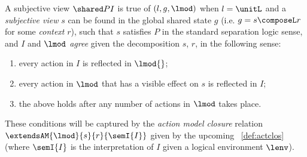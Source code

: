 A subjective view $\shared P I$ is true of $(l,g,\lmod)$ when $l = \unitL$ and a \emph{subjective view} $s$ can be found in the global shared state $g$ (i.e. $g = s\composeL r$ for some \emph{context} $r$), such that $s$ satisfies $P$ in the standard separation logic sense, and $I$ and $\lmod$ \emph{agree} given the
decomposition $s$, $r$, in the following sense:\vspace{-10pt}
%
\begin{enumerate}
	\item every action in $I$ is reflected in $\lmod{}$;
	
	\item every action in $\lmod$ that has a visible effect on $s$ is reflected in $I$;
	
	\item the above holds after any number of actions in $\lmod$ takes place.
\end{enumerate}\vspace{-10pt}
%
These conditions will be captured by the \emph{action model closure} relation $\extendsAM{\lmod}{s}{r}{\semI{I}}$ given by the upcoming ~\ref{def:actclos} (where $\semI{I}$ is the interpretation of $I$ given a logical environment $\lenv$).

